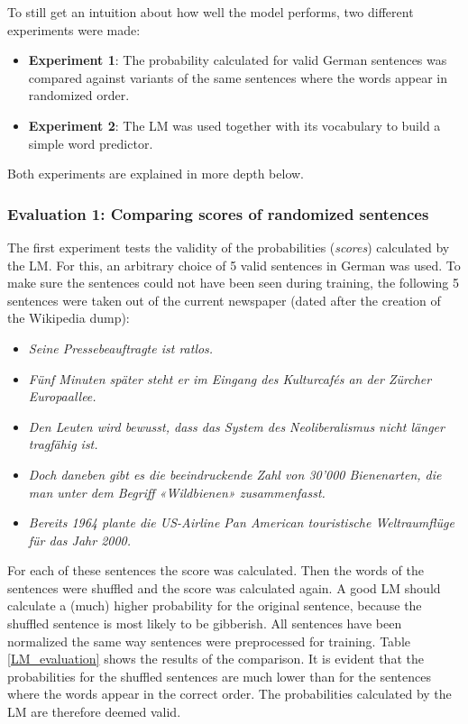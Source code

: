To still get an intuition about how well the model performs, two different experiments were made:

\begin{itemize}
	\item \textbf{Experiment 1}: The probability calculated for valid German sentences was compared against variants of the same sentences where the words appear in randomized order.
	\item \textbf{Experiment 2}: The \ac{LM} was used together with its vocabulary to build a simple word predictor.
\end{itemize}

Both experiments are explained in more depth below.

\subsubsection{Evaluation 1: Comparing scores of randomized sentences}

The first experiment tests the validity of the probabilities (\textit{scores}) calculated by the \ac{LM}. For this, an arbitrary choice of 5 valid sentences in German was used. To make sure the sentences could not have been seen during training, the following 5 sentences were taken out of the current newspaper (dated after the creation of the Wikipedia dump):

\begin{itemize}
	\item \textit{Seine Pressebeauftragte ist ratlos.}
	\item \textit{Fünf Minuten später steht er im Eingang des Kulturcafés an der Zürcher Europaallee.}
	\item \textit{Den Leuten wird bewusst, dass das System des Neoliberalismus nicht länger tragfähig ist.}
	\item \textit{Doch daneben gibt es die beeindruckende Zahl von 30'000 Bienenarten, die man unter dem Begriff «Wildbienen» zusammenfasst.}
	\item \textit{Bereits 1964 plante die US-Airline Pan American touristische Weltraumflüge für das Jahr 2000.}
\end{itemize}

For each of these sentences the score was calculated. Then the words of the sentences were shuffled and the score was calculated again. A good \ac{LM} should calculate a (much) higher probability for the original sentence, because the shuffled sentence is most likely to be gibberish. All sentences have been normalized the same way sentences were preprocessed for training. Table \ref{LM_evaluation} shows the results of the comparison. It is evident that the probabilities for the shuffled sentences are much lower than for the sentences where the words appear in the correct order. The probabilities calculated by the \ac{LM} are therefore deemed valid.

